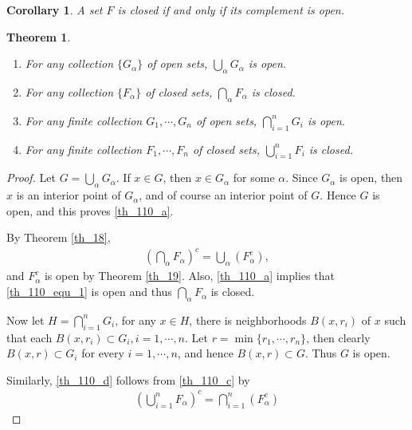 \documentclass[10pt]{book}
\newtheorem{theorem}{Theorem}[chapter]
\newtheorem{corollary}{Corollary}[theorem]
\theoremstyle{definition}
\numberwithin{equation}{chapter}
\begin{document}
\medskip

\begin{corollary}
A set $F$ is closed if and only if its complement is open.
\end{corollary}

\medskip

\begin{theorem}\label{th_110}
~\begin{enumerate}[label=(\alph*)]
    \item For any collection $\{G_{\alpha}\}$ of open sets, $\bigcup_{\alpha} G_{\alpha}$ is open.\label{th_110_a}
    
    \item For any collection $\{F_{\alpha}\}$ of closed sets, $\bigcap_{\alpha} F_{\alpha}$ is closed.\label{th_110_b}
    
    \item For any finite collection $G_1, \cdots, G_n$ of open sets, $\bigcap^n_{i=1} G_i$ is open.\label{th_110_c}
    
    \item For any finite collection $F_1, \cdots, F_n$ of closed sets, $\bigcup^n_{i=1} F_i$ is closed.\label{th_110_d}
\end{enumerate}
\end{theorem}
\begin{proof}
Let $G = \bigcup_{\alpha} G_{\alpha}$. If $x \in G$, then $x \in G_{\alpha}$ for some $\alpha$. Since $G_{\alpha}$ is open, then $x$ is an interior point of $G_{\alpha}$, and of course an interior point of $G$. Hence $G$ is open, and this proves \ref{th_110_a}.

By Theorem \ref{th_18}, 
\begin{align}\label{th_110_equ_1}
    \left(\bigcap_{\alpha} F_{\alpha}\right)^c = \bigcup_{\alpha} \left(F_{\alpha}^c\right),
\end{align}
and $F_{\alpha}^c$ is open by Theorem \ref{th_19}. Also, \ref{th_110_a} implies that \eqref{th_110_equ_1} is open and thus $\bigcap_{\alpha} F_{\alpha}$ is closed.

Now let $H = \bigcap^n_{i=1} G_i$, for any $x \in H$, there is neighborhoods $B(x,r_i)$ of $x$ such that each $B(x,r_i) \subset G_i, i = 1, \cdots, n$. Let $r = \min \{r_1, \cdots, r_n\}$, then clearly $B(x,r) \subset G_i$ for every $i = 1, \cdots, n$, and hence $B(x,r) \subset G$. Thus $G$ is open.

Similarly, \ref{th_110_d} follows from \ref{th_110_c} by
\begin{align*}
    \left(\bigcup^n_{i=1} F_{\alpha}\right)^c = \bigcap^n_{i=1} \left(F_{\alpha}^c\right)
\end{align*}
\end{proof}
\end{document}
